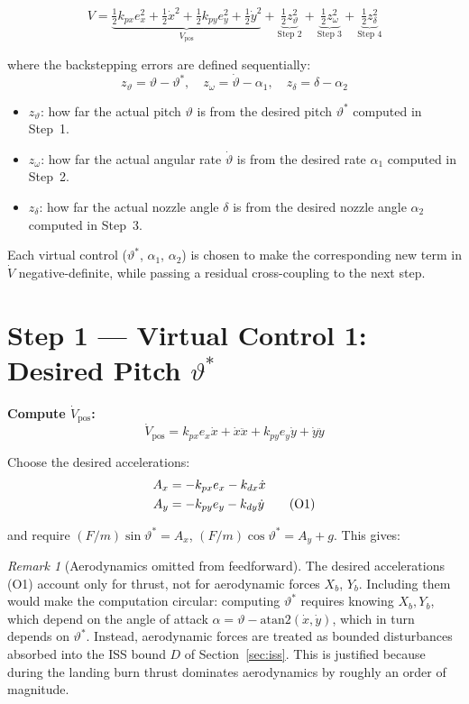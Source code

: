 \documentclass[11pt,a4paper]{article}
\theoremstyle{plain}
\theoremstyle{remark}
\newtheorem{remark}{Remark}[section]
\newcommand{\vth}{\vartheta}
\newcommand{\vths}{\vartheta^*}
\newcommand{\zth}{z_{\vth}}
\newcommand{\zom}{z_{\omega}}
\newcommand{\zdel}{z_{\delta}}
\begin{document}
\begin{equation}
  V = \underbrace{\tfrac{1}{2}k_{px}e_x^2 + \tfrac{1}{2}\dot x^2 + \tfrac{1}{2}k_{py}e_y^2 + \tfrac{1}{2}\dot y^2}_{V_{\mathrm{pos}}} + \underbrace{\tfrac{1}{2}\zth^2}_{\text{Step 2}} + \underbrace{\tfrac{1}{2}\zom^2}_{\text{Step 3}} + \underbrace{\tfrac{1}{2}\zdel^2}_{\text{Step 4}}
  \tag{V}
\end{equation}

where the backstepping errors are defined sequentially:
\[
  \zth = \vth - \vths, \quad \zom = \dot\vth - \alpha_1, \quad \zdel = \delta - \alpha_2
\]

\begin{itemize}
  \item $\zth$: how far the actual pitch $\vth$ is from the desired pitch $\vths$ computed in Step~1.
  \item $\zom$: how far the actual angular rate $\dot\vth$ is from the desired rate $\alpha_1$ computed in Step~2.
  \item $\zdel$: how far the actual nozzle angle $\delta$ is from the desired nozzle angle $\alpha_2$ computed in Step~3.
\end{itemize}

Each virtual control ($\vths$, $\alpha_1$, $\alpha_2$) is chosen to make the corresponding new term in $\dot V$ negative-definite, while passing a residual cross-coupling to the next step.

\section{Step 1 --- Virtual Control 1: Desired Pitch \texorpdfstring{$\vartheta^*$}{theta*}}

\textbf{Compute $\dot V_{\mathrm{pos}}$:}
\[
  \dot V_{\mathrm{pos}} = k_{px}e_x\dot x + \dot x\ddot x + k_{py}e_y\dot y + \dot y\ddot y
\]

Choose the desired accelerations:
\begin{align}
  A_x &= -k_{px}e_x - k_{dx}\dot x \notag \\
  A_y &= -k_{py}e_y - k_{dy}\dot y \tag{O1}
\end{align}

and require $(F/m)\sin\vths = A_x$, $(F/m)\cos\vths = A_y + g$. This gives:

\begin{remark}[Aerodynamics omitted from feedforward]
The desired accelerations (O1) account only for thrust, not for aerodynamic forces $X_b$, $Y_b$. Including them would make the computation circular: computing $\vths$ requires knowing $X_b, Y_b$, which depend on the angle of attack $\alpha = \vth - \mathrm{atan2}(\dot x, \dot y)$, which in turn depends on $\vths$. Instead, aerodynamic forces are treated as bounded disturbances absorbed into the ISS bound $D$ of Section~\ref{sec:iss}. This is justified because during the landing burn thrust dominates aerodynamics by roughly an order of magnitude.
\end{remark}
\end{document}
